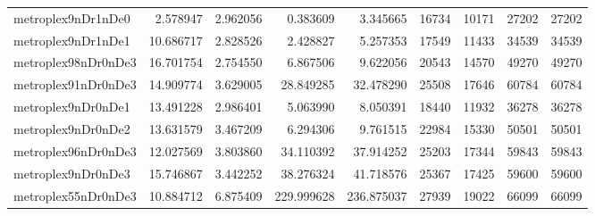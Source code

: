 \begin{longtable}{|l|r|r|r|r|r|r|r|r|}
metroplex9nDr1nDe0 & 2.578947 & 2.962056 & 0.383609 & 3.345665 & 16734 & 10171 & 27202 & 27202 \\
metroplex9nDr1nDe1 & 10.686717 & 2.828526 & 2.428827 & 5.257353 & 17549 & 11433 & 34539 & 34539 \\
metroplex98nDr0nDe3 & 16.701754 & 2.754550 & 6.867506 & 9.622056 & 20543 & 14570 & 49270 & 49270 \\
metroplex91nDr0nDe3 & 14.909774 & 3.629005 & 28.849285 & 32.478290 & 25508 & 17646 & 60784 & 60784 \\
metroplex9nDr0nDe1 & 13.491228 & 2.986401 & 5.063990 & 8.050391 & 18440 & 11932 & 36278 & 36278 \\
metroplex9nDr0nDe2 & 13.631579 & 3.467209 & 6.294306 & 9.761515 & 22984 & 15330 & 50501 & 50501 \\
metroplex96nDr0nDe3 & 12.027569 & 3.803860 & 34.110392 & 37.914252 & 25203 & 17344 & 59843 & 59843 \\
metroplex9nDr0nDe3 & 15.746867 & 3.442252 & 38.276324 & 41.718576 & 25367 & 17425 & 59600 & 59600 \\
metroplex55nDr0nDe3 & 10.884712 & 6.875409 & 229.999628 & 236.875037 & 27939 & 19022 & 66099 & 66099 \\
\end{longtable}
